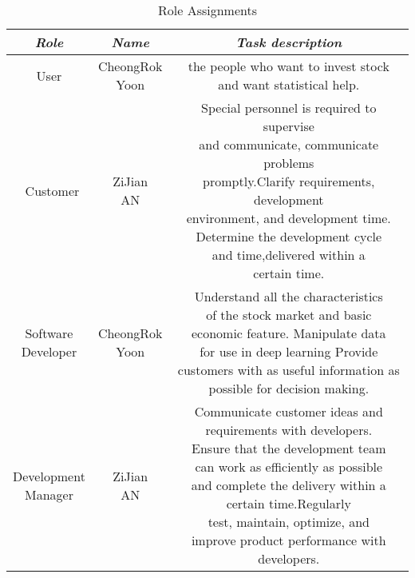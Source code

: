\documentclass[conference]{IEEEtran}
\begin{document}
\begin{table}[htbp]
\caption{Role Assignments}
\begin{center}
\begin{tabular}{ | c | c | c | } 
\hline
\textbf{\textit{Role}}& \textbf{\textit{Name}}& \textbf{\textit{Task description}} \\
\hline
User& \makecell{CheongRok\\Yoon}& \makecell{the people who want to invest stock\\ and want statistical help.}   \\
\hline\
Customer& \makecell{ZiJian\\AN}& \makecell{Special personnel is required to supervise\\ and communicate, communicate problems \\promptly.Clarify requirements, development\\ environment, and development time.\\Determine the development cycle\\ and time,delivered within a \\certain time.}\\
\hline
\makecell{Software\\Developer}& \makecell{CheongRok\\Yoon}& \makecell{Understand all the characteristics \\of the stock market and basic\\ economic feature. Manipulate data \\for use in deep learning Provide\\ customers with as useful information as\\ possible for decision making.} \\
\hline
\makecell{Development\\Manager}& \makecell{ZiJian\\AN}& \makecell{Communicate customer ideas and \\requirements with developers.\\Ensure that the development team\\ can work as efficiently as possible\\and complete the delivery within a\\ certain time.Regularly \\test, maintain, optimize, and \\improve product performance with developers.}\\
\hline
\end{tabular}
\label{tab1}
\end{center}
\end{table}
\end{document}
